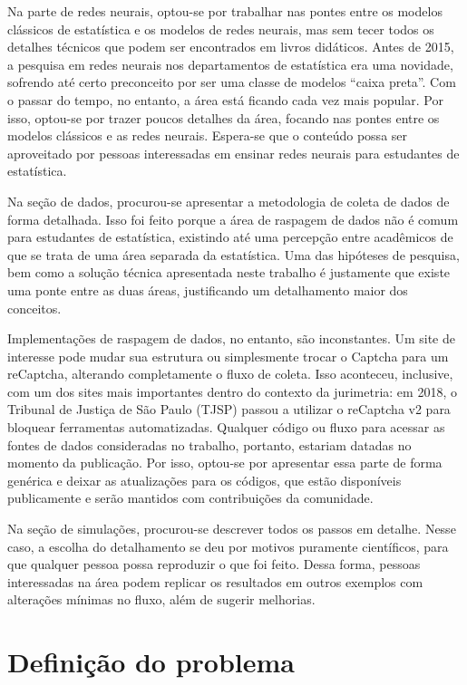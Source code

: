 \documentclass[12pt,twoside,brazilian]{book}
\begin{document}
Na parte de redes neurais, optou-se por trabalhar nas pontes entre os
modelos clássicos de estatística e os modelos de redes neurais, mas sem
tecer todos os detalhes técnicos que podem ser encontrados em livros
didáticos. Antes de 2015, a pesquisa em redes neurais nos departamentos
de estatística era uma novidade, sofrendo até certo preconceito por ser
uma classe de modelos ``caixa preta''. Com o passar do tempo, no
entanto, a área está ficando cada vez mais popular. Por isso, optou-se
por trazer poucos detalhes da área, focando nas pontes entre os modelos
clássicos e as redes neurais. Espera-se que o conteúdo possa ser
aproveitado por pessoas interessadas em ensinar redes neurais para
estudantes de estatística.

Na seção de dados, procurou-se apresentar a metodologia de coleta de
dados de forma detalhada. Isso foi feito porque a área de raspagem de
dados não é comum para estudantes de estatística, existindo até uma
percepção entre acadêmicos de que se trata de uma área separada da
estatística. Uma das hipóteses de pesquisa, bem como a solução técnica
apresentada neste trabalho é justamente que existe uma ponte entre as
duas áreas, justificando um detalhamento maior dos conceitos.

Implementações de raspagem de dados, no entanto, são inconstantes. Um
site de interesse pode mudar sua estrutura ou simplesmente trocar o
Captcha para um reCaptcha, alterando completamente o fluxo de coleta.
Isso aconteceu, inclusive, com um dos sites mais importantes dentro do
contexto da jurimetria: em 2018, o Tribunal de Justiça de São Paulo
(TJSP) passou a utilizar o reCaptcha v2 para bloquear ferramentas
automatizadas. Qualquer código ou fluxo para acessar as fontes de dados
consideradas no trabalho, portanto, estariam datadas no momento da
publicação. Por isso, optou-se por apresentar essa parte de forma
genérica e deixar as atualizações para os códigos, que estão disponíveis
publicamente e serão mantidos com contribuições da comunidade.

Na seção de simulações, procurou-se descrever todos os passos em
detalhe. Nesse caso, a escolha do detalhamento se deu por motivos
puramente científicos, para que qualquer pessoa possa reproduzir o que
foi feito. Dessa forma, pessoas interessadas na área podem replicar os
resultados em outros exemplos com alterações mínimas no fluxo, além de
sugerir melhorias.

\hypertarget{definiuxe7uxe3o-do-problema}{%
\section{Definição do problema}\label{definiuxe7uxe3o-do-problema}}
\end{document}
